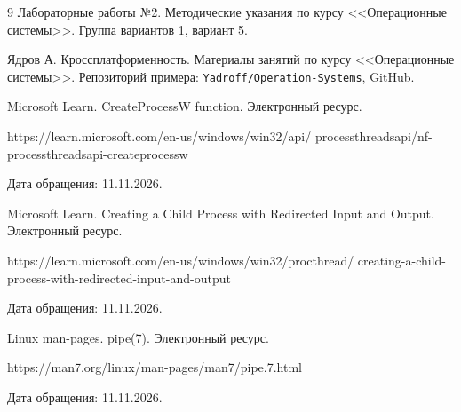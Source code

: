 \begin{thebibliography}{9}
Лабораторные работы №2. Методические указания по курсу <<Операционные системы>>. Группа вариантов 1, вариант 5.

Ядров А. Кроссплатформенность. Материалы занятий по курсу <<Операционные системы>>. Репозиторий примера: \texttt{Yadroff/Operation-Systems}, GitHub.

Microsoft Learn. CreateProcessW function. Электронный ресурс.\\
{\small\ttfamily\raggedright
https://learn.microsoft.com/en-us/windows/win32/api/\allowbreak
processthreadsapi/\allowbreak nf-processthreadsapi-createprocessw\par}
Дата обращения: 11.11.2026.

Microsoft Learn. Creating a Child Process with Redirected Input and Output. Электронный ресурс.\\
{\small\ttfamily\raggedright
https://learn.microsoft.com/en-us/windows/win32/procthread/\allowbreak
creating-a-child-process-with-redirected-input-and-output\par}
Дата обращения: 11.11.2026.

Linux man-pages. pipe(7). Электронный ресурс.\\
{\small\ttfamily\raggedright
https://man7.org/linux/man-pages/man7/pipe.7.html\par}
Дата обращения: 11.11.2026.
\end{thebibliography}
